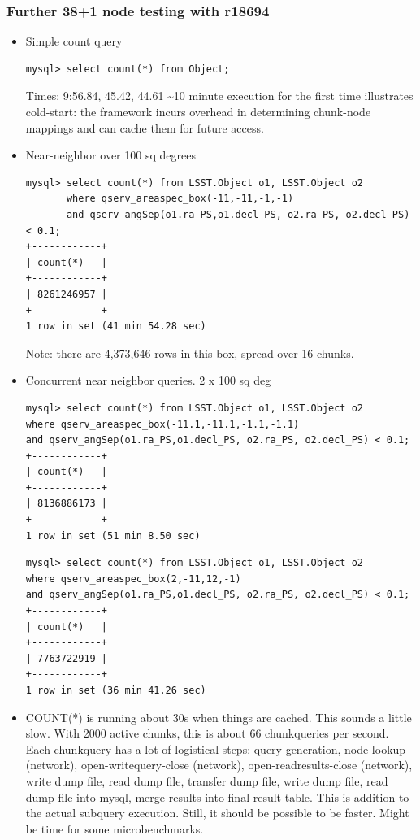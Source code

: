 \documentclass[DM,toc]{lsstdoc}
\begin{document}
\subsubsection{Further 38+1 node testing with
r18694}\label{further-381-node-testing-with-r18694}

\begin{itemize}
\item
  Simple count query

\begin{verbatim}
mysql> select count(*) from Object;
\end{verbatim}

Times: 9:56.84, 45.42, 44.61 \textasciitilde{}10 minute execution for
the first time illustrates cold-start: the framework incurs overhead in
determining chunk-node mappings and can cache them for future access.

\item
  Near-neighbor over 100 sq degrees

\begin{verbatim}
mysql> select count(*) from LSST.Object o1, LSST.Object o2
       where qserv_areaspec_box(-11,-11,-1,-1)
       and qserv_angSep(o1.ra_PS,o1.decl_PS, o2.ra_PS, o2.decl_PS) < 0.1;
+------------+
| count(*)   |
+------------+
| 8261246957 |
+------------+
1 row in set (41 min 54.28 sec)
\end{verbatim}

Note: there are 4,373,646 rows in this box, spread over 16 chunks.

\item
  Concurrent near neighbor queries. 2 x 100 sq deg

\begin{verbatim}
mysql> select count(*) from LSST.Object o1, LSST.Object o2
where qserv_areaspec_box(-11.1,-11.1,-1.1,-1.1)
and qserv_angSep(o1.ra_PS,o1.decl_PS, o2.ra_PS, o2.decl_PS) < 0.1;
+------------+
| count(*)   |
+------------+
| 8136886173 |
+------------+
1 row in set (51 min 8.50 sec)
\end{verbatim}

\begin{verbatim}
mysql> select count(*) from LSST.Object o1, LSST.Object o2
where qserv_areaspec_box(2,-11,12,-1)
and qserv_angSep(o1.ra_PS,o1.decl_PS, o2.ra_PS, o2.decl_PS) < 0.1;
+------------+
| count(*)   |
+------------+
| 7763722919 |
+------------+
1 row in set (36 min 41.26 sec)
\end{verbatim}

\item
  COUNT(*) is running about 30s when things are cached. This sounds a
  little slow. With 2000 active chunks, this is about 66 chunkqueries
  per second. Each chunkquery has a lot of logistical steps: query
  generation, node lookup (network), open-writequery-close (network),
  open-readresults-close (network), write dump file, read dump file,
  transfer dump file, write dump file, read dump file into mysql, merge
  results into final result table. This is addition to the actual
  subquery execution. Still, it should be possible to be faster. Might
  be time for some microbenchmarks.
\end{itemize}
\end{document}
